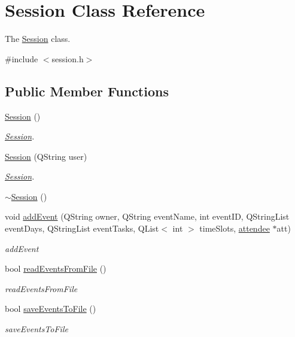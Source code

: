 \hypertarget{class_session}{}\section{Session Class Reference}
\label{class_session}


The \hyperlink{class_session}{Session} class.  




{\ttfamily \#include $<$session.\+h$>$}

\subsection*{Public Member Functions}
\begin{DoxyCompactItemize}
\item 
\hyperlink{class_session_ad92ef09b872c9227e38a6efdd4d8a837}{Session} ()
\begin{DoxyCompactList}\small\item\em \hyperlink{class_session}{Session}. \end{DoxyCompactList}\item 
\hyperlink{class_session_a0a7362dd58b94a67af892eb2cda1082a}{Session} (Q\+String user)
\begin{DoxyCompactList}\small\item\em \hyperlink{class_session}{Session}. \end{DoxyCompactList}\item 
\hyperlink{class_session_a8753bb9dee966b7d39abc9b7237cd665}{$\sim$\+Session} ()
\item 
void \hyperlink{class_session_a195911688579c457cf7e71c29ded7489}{add\+Event} (Q\+String owner, Q\+String event\+Name, int event\+ID, Q\+String\+List event\+Days, Q\+String\+List event\+Tasks, Q\+List$<$ int $>$ time\+Slots, \hyperlink{classattendee}{attendee} $\ast$att)
\begin{DoxyCompactList}\small\item\em add\+Event \end{DoxyCompactList}\item 
bool \hyperlink{class_session_aff9fd19eb09a0ac22d3e2c2615f9f9e9}{read\+Events\+From\+File} ()
\begin{DoxyCompactList}\small\item\em read\+Events\+From\+File \end{DoxyCompactList}\item 
bool \hyperlink{class_session_af095af8449dd10f6fdf3db6d530e109e}{save\+Events\+To\+File} ()
\begin{DoxyCompactList}\small\item\em save\+Events\+To\+File \end{DoxyCompactList}\item 

\end{DoxyCompactItemize}
